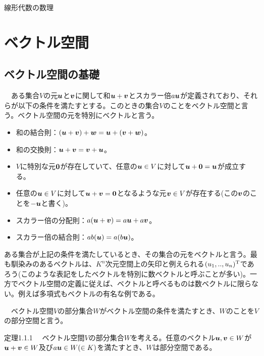 \documentclass[dvipdfmx, 9pt, a4paper]{jsarticle}
\numberwithin{equation}{subsection}
\newcommand{\bm}[1]{{\mbox{\boldmath $#1$}}}
\begin{document}
\begin{center}
{\fontsize{18pt}{1pt}\selectfont 線形代数の数理}\\
\end{center}
\section{ベクトル空間}
\subsection{ベクトル空間の基礎}
\begin{tcolorbox}[title=ベクトル空間]
　ある集合$V$の元$\bm u$と$\bm v$に関して和$\bm u+\bm v$とスカラー倍$a\bm u$が定義されており、それらが以下の条件を満たすとする。このときの集合$V$のことをベクトル空間と言う。ベクトル空間の元を特別にベクトルと言う。
\begin{itemize}
\item 和の結合則：$(\bm u+\bm v)+\bm w=\bm u+(\bm v+\bm w)$。
\item 和の交換則：$\bm u+\bm v=\bm v+\bm u$。
\item $V$に特別な元$\bm 0$が存在していて、任意の$\bm u \in V$に対して$\bm u+\bm 0=\bm u$が成立する。
\item 任意の$\bm u \in V$に対して$\bm u+\bm v=\bm 0$となるような元$\bm v \in V$が存在する(この$\bm v$のことを$-\bm u$と書く)。
\item スカラー倍の分配則：$a(\bm u+\bm v)=a\bm u+a\bm v$。
\item スカラー倍の結合則：$ab(\bm u)=a(b\bm u)$。
\end{itemize}
\end{tcolorbox}\par
ある集合が上記の条件を満たしているとき、その集合の元をベクトルと言う。最も馴染みのあるベクトルは、$K^n$次元空間上の矢印と例えられる$(u_1, .., u_n)^{\rm T}$であろう(このような表記をしたベクトルを特別に数ベクトルと呼ぶことが多い)。一方でベクトル空間の定義に従えば、ベクトルと呼べるものは数ベクトルに限らない。例えば多項式もベクトルの有名な例である。
\begin{tcolorbox}[title=部分空間]
　ベクトル空間$V$の部分集合$W$がベクトル空間の条件を満たすとき、$W$のことを$V$の部分空間と言う。
\end{tcolorbox}
\begin{itembox}[l]{定理1.1.1}
　ベクトル空間$V$の部分集合$W$を考える。任意のベクトル$\bm u, \bm v \in W$が$\bm u+\bm v \in W$及び$a\bm u \in W( \in K)$を満たすとき、$W$は部分空間である。
\end{itembox}
\end{document}
